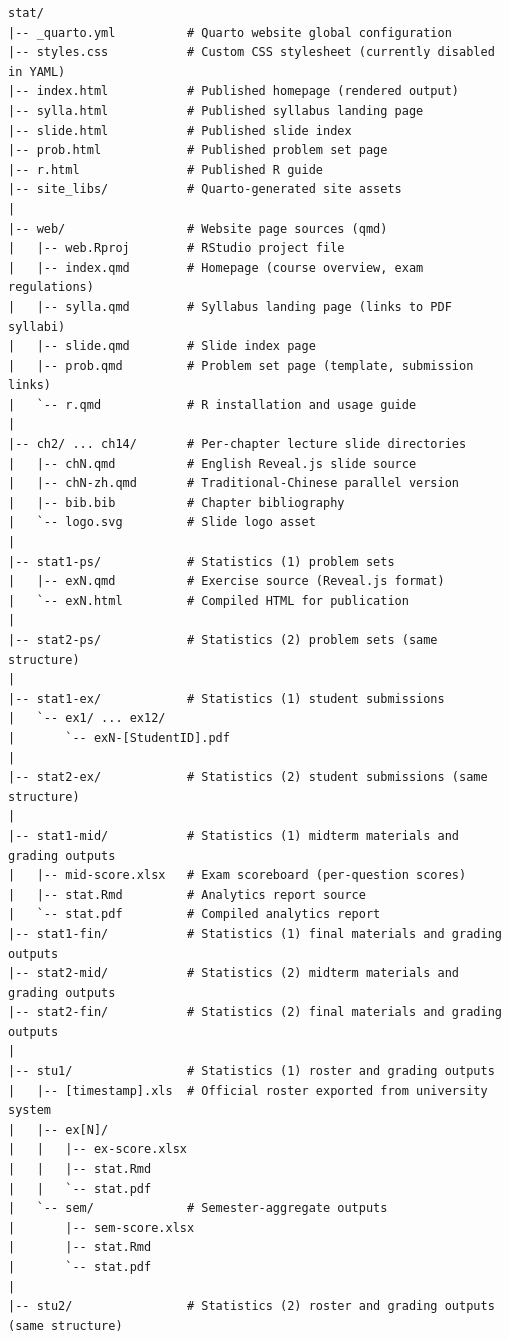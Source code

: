\documentclass[
]{article}
\begin{document}
\begin{verbatim}
stat/
|-- _quarto.yml          # Quarto website global configuration
|-- styles.css           # Custom CSS stylesheet (currently disabled in YAML)
|-- index.html           # Published homepage (rendered output)
|-- sylla.html           # Published syllabus landing page
|-- slide.html           # Published slide index
|-- prob.html            # Published problem set page
|-- r.html               # Published R guide
|-- site_libs/           # Quarto-generated site assets
|
|-- web/                 # Website page sources (qmd)
|   |-- web.Rproj        # RStudio project file
|   |-- index.qmd        # Homepage (course overview, exam regulations)
|   |-- sylla.qmd        # Syllabus landing page (links to PDF syllabi)
|   |-- slide.qmd        # Slide index page
|   |-- prob.qmd         # Problem set page (template, submission links)
|   `-- r.qmd            # R installation and usage guide
|
|-- ch2/ ... ch14/       # Per-chapter lecture slide directories
|   |-- chN.qmd          # English Reveal.js slide source
|   |-- chN-zh.qmd       # Traditional-Chinese parallel version
|   |-- bib.bib          # Chapter bibliography
|   `-- logo.svg         # Slide logo asset
|
|-- stat1-ps/            # Statistics (1) problem sets
|   |-- exN.qmd          # Exercise source (Reveal.js format)
|   `-- exN.html         # Compiled HTML for publication
|
|-- stat2-ps/            # Statistics (2) problem sets (same structure)
|
|-- stat1-ex/            # Statistics (1) student submissions
|   `-- ex1/ ... ex12/
|       `-- exN-[StudentID].pdf
|
|-- stat2-ex/            # Statistics (2) student submissions (same structure)
|
|-- stat1-mid/           # Statistics (1) midterm materials and grading outputs
|   |-- mid-score.xlsx   # Exam scoreboard (per-question scores)
|   |-- stat.Rmd         # Analytics report source
|   `-- stat.pdf         # Compiled analytics report
|-- stat1-fin/           # Statistics (1) final materials and grading outputs
|-- stat2-mid/           # Statistics (2) midterm materials and grading outputs
|-- stat2-fin/           # Statistics (2) final materials and grading outputs
|
|-- stu1/                # Statistics (1) roster and grading outputs
|   |-- [timestamp].xls  # Official roster exported from university system
|   |-- ex[N]/
|   |   |-- ex-score.xlsx
|   |   |-- stat.Rmd
|   |   `-- stat.pdf
|   `-- sem/             # Semester-aggregate outputs
|       |-- sem-score.xlsx
|       |-- stat.Rmd
|       `-- stat.pdf
|
|-- stu2/                # Statistics (2) roster and grading outputs (same structure)

\end{verbatim}
\end{document}
